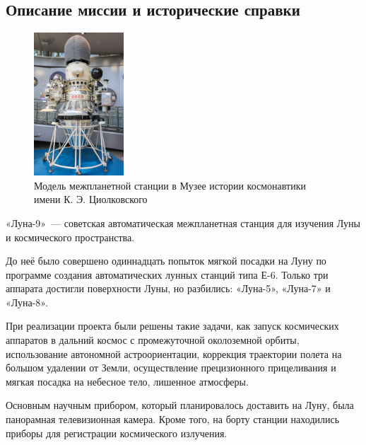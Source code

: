 \subsection{Описание миссии и исторические справки}
\begin{figure} %
	\centering
	\includegraphics[width=0.3\textwidth]{Luna_9_Space_Probe}
	\caption{Модель межпланетной станции в Музее истории космонавтики имени К. Э. Циолковского}
\end{figure}

\noindent «Луна-9» — советская автоматическая межпланетная станция для изучения Луны и космического пространства. 

\noindent До неё было совершено одиннадцать попыток мягкой посадки на Луну по программе создания автоматических лунных станций типа Е-6. Только три аппарата достигли поверхности Луны, но разбились: «Луна-5», «Луна-7» и «Луна-8».

\noindent При реализации проекта были решены такие задачи, как запуск космических аппаратов в дальний космос с промежуточной околоземной орбиты, использование автономной астроориентации, коррекция траектории полета на большом удалении от Земли, осуществление прецизионного прицеливания и мягкая посадка на небесное тело, лишенное атмосферы.

\noindent Основным научным прибором, который планировалось доставить на Луну, была панорамная телевизионная камера. Кроме того, на борту станции находились приборы для регистрации космического излучения.

